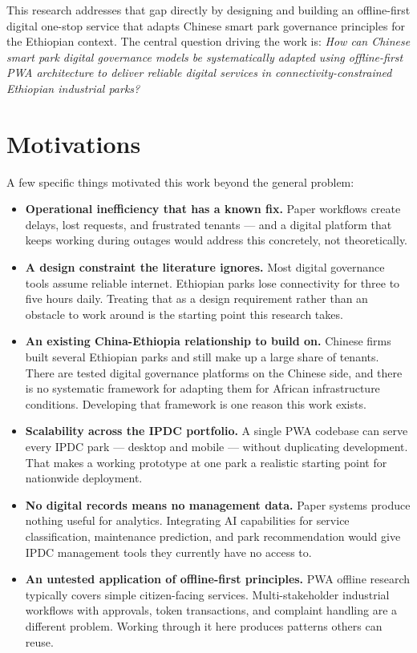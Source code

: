 This research addresses that gap directly by designing and building an offline-first digital one-stop service that adapts Chinese smart park governance principles for the Ethiopian context. The central question driving the work is: \textit{How can Chinese smart park digital governance models be systematically adapted using offline-first PWA architecture to deliver reliable digital services in connectivity-constrained Ethiopian industrial parks?}

\section{Motivations}

A few specific things motivated this work beyond the general problem:

\begin{itemize}
\item \textbf{Operational inefficiency that has a known fix.} Paper workflows create delays, lost requests, and frustrated tenants --- and a digital platform that keeps working during outages would address this concretely, not theoretically.

\item \textbf{A design constraint the literature ignores.} Most digital governance tools assume reliable internet. Ethiopian parks lose connectivity for three to five hours daily. Treating that as a design requirement rather than an obstacle to work around is the starting point this research takes.

\item \textbf{An existing China-Ethiopia relationship to build on.} Chinese firms built several Ethiopian parks and still make up a large share of tenants. There are tested digital governance platforms on the Chinese side, and there is no systematic framework for adapting them for African infrastructure conditions. Developing that framework is one reason this work exists.

\item \textbf{Scalability across the IPDC portfolio.} A single PWA codebase can serve every IPDC park --- desktop and mobile --- without duplicating development. That makes a working prototype at one park a realistic starting point for nationwide deployment.

\item \textbf{No digital records means no management data.} Paper systems produce nothing useful for analytics. Integrating AI capabilities for service classification, maintenance prediction, and park recommendation would give IPDC management tools they currently have no access to.

\item \textbf{An untested application of offline-first principles.} PWA offline research typically covers simple citizen-facing services. Multi-stakeholder industrial workflows with approvals, token transactions, and complaint handling are a different problem. Working through it here produces patterns others can reuse.
\end{itemize}

